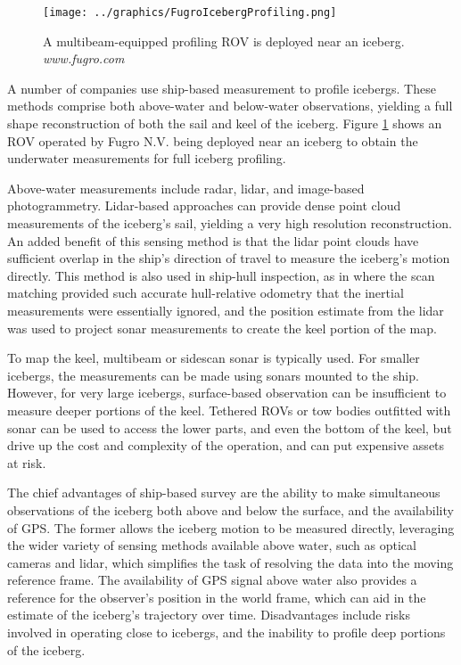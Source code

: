 \begin{figure}[!htb]
   \centering
   \texttt{[image: ../graphics/FugroIcebergProfiling.png]} %
   \caption{ A multibeam-equipped profiling ROV is deployed near an iceberg. \emph{www.fugro.com}}
   \label{fig:IcebergROV}
\end{figure}

A number of companies use ship-based measurement to profile icebergs. These methods comprise both above-water and below-water observations, yielding a full shape reconstruction of both the sail and keel of the iceberg. Figure \ref{fig:IcebergROV} shows an ROV operated by Fugro N.V. being deployed near an iceberg to obtain the underwater measurements for full iceberg profiling.

Above-water measurements include radar, lidar, and image-based photogrammetry. Lidar-based approaches can provide dense point cloud measurements of the iceberg's sail, yielding a very high resolution reconstruction. An added benefit of this sensing method is that the lidar point clouds have sufficient overlap in the ship's direction of travel to measure the iceberg's motion directly. This method is also used in ship-hull inspection, as in \cite{Papadopoulos2014} where the scan matching provided such accurate hull-relative odometry that the inertial measurements were essentially ignored, and the position estimate from the lidar was used to project sonar measurements to create the keel portion of the map.

To map the keel, multibeam or sidescan sonar is typically used. For smaller icebergs, the measurements can be made using sonars mounted to the ship. However, for very large icebergs, surface-based observation can be insufficient to measure deeper portions of the keel. Tethered ROVs or tow bodies outfitted with sonar can be used to access the lower parts, and even the bottom of the keel, but drive up the cost and complexity of the operation, and can put expensive assets at risk. 

The chief advantages of ship-based survey are the ability to make simultaneous observations of the iceberg both above and below the surface, and the availability of GPS. The former allows the iceberg motion to be measured directly, leveraging the wider variety of sensing methods available above water, such as optical cameras and lidar, which simplifies the task of resolving the data into the moving reference frame. The availability of GPS signal above water also provides a reference for the observer's position in the world frame, which can aid in the estimate of the iceberg's trajectory over time. Disadvantages include risks involved in operating close to icebergs, and the inability to profile deep portions of the iceberg. 

